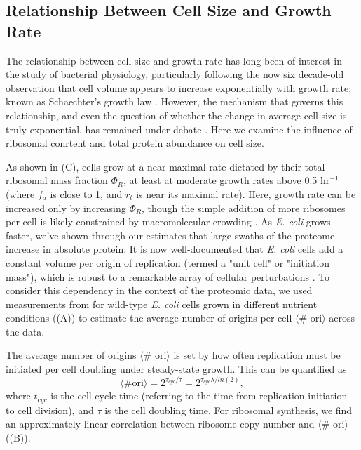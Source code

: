 \subsection{Relationship Between Cell Size and Growth Rate}
The relationship between cell size and growth rate has long been of interest in
the study of bacterial physiology, particularly following the now six decade-old
observation that cell volume appears to increase exponentially with growth rate;
known as Schaechter's growth law \citep{schaechter1958, taheriaraghi2015}.
However, the mechanism that governs this relationship, and even the question of
whether the change in average cell size is truly exponential, has remained under
debate \citep{harris2018}.  Here we examine the influence of ribosomal conrtent
and total protein abundance on cell size.

As shown in (C), cells grow at a near-maximal rate dictated
by their total ribosomal mass fraction $\Phi_R$, at least at moderate growth
rates above 0.5 hr$^{-1}$ (where $f_a$ is close to 1, and $r_t$ is near its
maximal rate).  Here, growth rate can be increased only by increasing  $\Phi_R$,
though the simple addition of more ribosomes per cell is likely constrained by
macromolecular crowding \citep{delarue2018, solerbistue2020}. As \textit{E.
coli} grows faster, we've shown through our estimates that large swaths of the
proteome increase in absolute protein. It is now well-documented that \textit{E.
coli} cells add a constant volume per origin of replication (termed a "unit
cell" or "initiation mass"), which is robust to a remarkable array of cellular
perturbations \citep{si2017}. To consider this dependency in the context of the
proteomic data, we used measurements from \cite{si2017} for wild-type \textit{E.
coli} cells grown in different nutrient conditions
((A)) to estimate the average number of origins per
cell $\langle$\# ori$\rangle$ across the data.

The average number of origins $\langle$\# ori$\rangle$ is set by how often
replication must be initiated per cell doubling under steady-state growth.
This can be quantified as
\begin{equation}
    \langle \text{\# ori} \rangle = 2^{\tau_{cyc} / \tau} = 2^{\tau_{cyc} \lambda / ln(2)},
    \label{eq:Nori}
\end{equation}
where $t_{cyc}$ is the cell cycle time (referring to the time from replication
initiation to cell division), and $\tau$ is the cell doubling time. For
ribosomal synthesis, we find an approximately linear correlation between
ribosome copy number and $\langle$\# ori$\rangle$
((B)).

